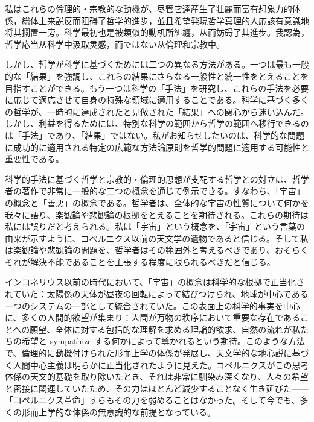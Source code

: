 \documentclass[a4paper,11pt,openany]{ltjsbook}
\begin{document}
私はこれらの倫理的・宗教的な動機が、尽管它達産生了壮麗而富有想象力的体係，総体上来説反而阻碍了哲学的進步，並且希望発現哲学真理的人応該有意識地将其擱置一旁。科学最初也是被類似的動机所糾纏，从而妨碍了其進步。我認為，哲学応当从科学中汲取灵感，而ではない从倫理和宗教中。

しかし、哲学が科学に基づくためには二つの異なる方法がある。一つは最も一般的な「結果」を強調し、これらの結果にさらなる一般性と統一性をとえることを目指すことができる。もう一つは科学の「手法」を研究し、これらの手法を必要に応じて適応させて自身の特殊な領域に適用することである。科学に基づく多くの哲学が、一時的に達成されたと見做された「結果」への関心から迷い込んだ。しかし、利益を得るためには、特別な科学の範囲から哲学の範囲へ移行できるのは「手法」であり、「結果」ではない。私がお知らせしたいのは、科学的な問題に成功的に適用される特定の広範な方法論原則を哲学的問題に適用する可能性と重要性である。

科学的手法に基づく哲学と宗教的・倫理的思想が支配する哲学との対立は、哲学者の著作で非常に一般的な二つの概念を通じて例示できる。すなわち、「宇宙」の概念と「善悪」の概念である。哲学者は、全体的な宇宙の性質について何かを我々に語り、楽観論や悲観論の根拠をとえることを期待される。これらの期待は私には誤りだと考えられる。私は「宇宙」という概念を、「宇宙」という言葉の由来が示すように、コペルニクス以前の天文学の遺物であると信じる。そして私は楽観論や悲観論の問題を、哲学者はその範囲外と考えるべきであり、おそらくそれが解決不能であることを主張する程度に限られるべきだと信じる。

インコネリウス以前の時代において、「宇宙」の概念は科学的な根拠で正当化されていた：太陽係の天体が昼夜の回転によって結びつけられ、地球が中心である一つのシステムの一部として統合されていた。この表面上の科学的事実を中心に、多くの人間的欲望が集まり：人間が万物の秩序において重要な存在であることへの願望、全体に対する包括的な理解を求める理論的欲求、自然の流れが私たちの希望と sympathize する何かによって導かれるという期待。このような方法で、倫理的に動機付けられた形而上学の体係が発展し、天文学的な地心説に基づく人間中心主義は明らかに正当化されたように見えた。コペルニクスがこの思考体係の天文的基礎を取り除いたとき、それは非常に馴染み深くなり、人々の希望と密接に関連していたため、その力はほとんど減少することなく生き延びた——「コペルニクス革命」すらもその力を弱めることはなかった。そして今でも、多くの形而上学的な体係の無意識的な前提となっている。
\end{document}
